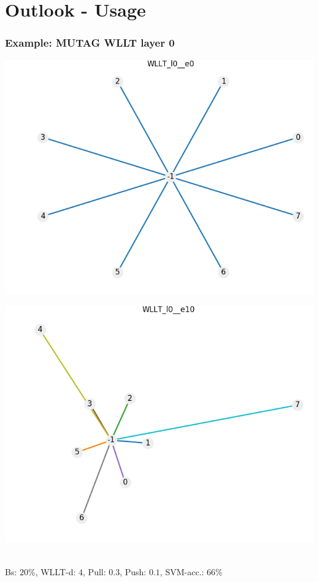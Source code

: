 \section{Outlook - Usage}
\begin{frame}\frametitle{Example: MUTAG WLLT layer 0}
	\begin{minipage}{0.49\textwidth}
		\includegraphics[width=\textwidth]{images/plotWlltl0}
	\end{minipage}
	\begin{minipage}{0.49\textwidth}
		\includegraphics[width=\textwidth]{images/plotWlltl1}
	\end{minipage}
	\vspace{2cm} \\
	\tiny{Bs: $20\%$, WLLT-d: $4$, Pull: $0.3$, Push: $0.1$, SVM-acc.: $66\%$}
\end{frame}

